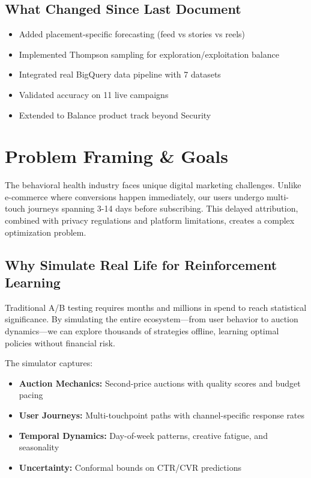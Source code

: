 \documentclass[11pt,a4paper]{report}
\begin{document}
\section{What Changed Since Last Document}

\begin{itemize}[itemsep=0.3em]
    \item Added placement-specific forecasting (feed vs stories vs reels)
    \item Implemented Thompson sampling for exploration/exploitation balance
    \item Integrated real BigQuery data pipeline with 7 datasets
    \item Validated accuracy on 11 live campaigns
    \item Extended to Balance product track beyond Security
\end{itemize}

\chapter{Problem Framing \& Goals}

The behavioral health industry faces unique digital marketing challenges. Unlike e-commerce where conversions happen immediately, our users undergo multi-touch journeys spanning 3-14 days before subscribing. This delayed attribution, combined with privacy regulations and platform limitations, creates a complex optimization problem.

\section{Why Simulate Real Life for Reinforcement Learning}

Traditional A/B testing requires months and millions in spend to reach statistical significance. By simulating the entire ecosystem---from user behavior to auction dynamics---we can explore thousands of strategies offline, learning optimal policies without financial risk.

The simulator captures:
\begin{itemize}
    \item \textbf{Auction Mechanics:} Second-price auctions with quality scores and budget pacing
    \item \textbf{User Journeys:} Multi-touchpoint paths with channel-specific response rates
    \item \textbf{Temporal Dynamics:} Day-of-week patterns, creative fatigue, and seasonality
    \item \textbf{Uncertainty:} Conformal bounds on CTR/CVR predictions
\end{itemize}
\end{document}

